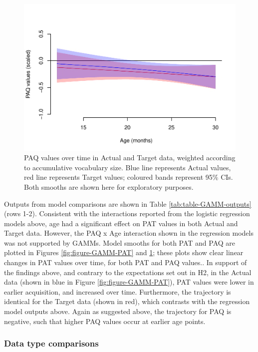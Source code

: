 \documentclass[
  man,mask,floatsintext]{apa6}
\begin{document}
\begin{figure}
\centering
\includegraphics{PhonNetworksProj-anon_files/figure-latex/figure-GAMM-PAQ-1.pdf}
\caption{\label{fig:figure-GAMM-PAQ}PAQ values over time in Actual and Target data, weighted according to accumulative vocabulary size. Blue line represents Actual values, red line represents Target values; coloured bands represent 95\% CIs. Both smooths are shown here for exploratory purposes.}
\end{figure}

Outputs from model comparisons are shown in Table \ref{tab:table-GAMM-outputs} (rows 1-2). Consistent with the interactions reported from the logistic regression models above, age had a significant effect on PAT values in both Actual and Target data. However, the PAQ x Age interaction shown in the regression models was not supported by GAMMs. Model smooths for both PAT and PAQ are plotted in Figures \ref{fig:figure-GAMM-PAT} and \ref{fig:figure-GAMM-PAQ}; these plots show clear linear changes in PAT values over time, for both PAT and PAQ values.. In support of the findings above, and contrary to the expectations set out in H2, in the Actual data (shown in blue in Figure \ref{fig:figure-GAMM-PAT}), PAT values were lower in earlier acquisition, and increased over time. Furthermore, the trajectory is identical for the Target data (shown in red), which contrasts with the regression model outputs above. Again as suggested above, the trajectory for PAQ is negative, such that higher PAQ values occur at earlier age points.

\hypertarget{data-type-comparisons}{%
\subsubsection{Data type comparisons}\label{data-type-comparisons}}
\end{document}
